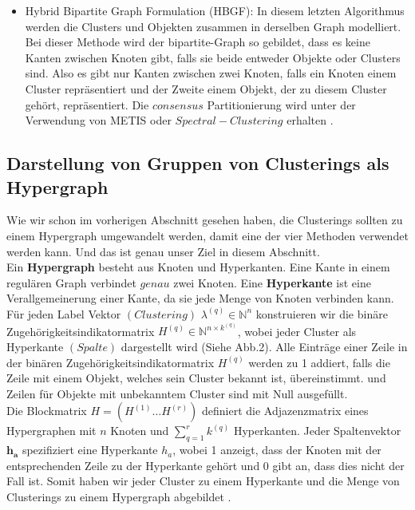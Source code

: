 \documentclass[runningheads]{llncs}
\begin{document}
\begin{itemize}
	\item Hybrid Bipartite Graph Formulation (HBGF): In diesem letzten Algorithmus werden die Clusters und Objekten zusammen in derselben Graph modelliert. Bei dieser Methode wird der bipartite-Graph so gebildet, dass es keine Kanten zwischen Knoten gibt, falls sie beide entweder Objekte oder Clusters sind. Also es gibt nur Kanten zwischen zwei Knoten, falls ein Knoten einem Cluster repräsentiert und der Zweite einem Objekt, der zu diesem Cluster gehört, repräsentiert. Die $consensus$ Partitionierung wird unter der Verwendung von METIS oder $Spectral-Clustering$ erhalten \cite{vega2011survey}.  
\end{itemize}  


\subsection{Darstellung von Gruppen von Clusterings als Hypergraph}
Wie wir schon im vorherigen Abschnitt gesehen haben, die Clusterings sollten zu einem Hypergraph umgewandelt werden, damit eine der vier Methoden verwendet werden kann. Und das ist genau unser Ziel in diesem Abschnitt.\\
Ein \textbf{Hypergraph} besteht aus Knoten und Hyperkanten. Eine Kante in einem regulären Graph verbindet $genau$ zwei Knoten. Eine \textbf{Hyperkante} ist eine Verallgemeinerung einer Kante, da sie jede Menge von Knoten verbinden kann.\\[4pt]
Für jeden Label Vektor $(Clustering)$ $\lambda^{(q)} \in \mathbb{N}^{n}$ konstruieren wir die binäre Zugehörigkeitsindikatormatrix  $H^{(q)} \in \mathbb{N}^{n \times k^{(q)}}$, wobei jeder Cluster als Hyperkante $(Spalte)$ dargestellt wird (Siehe Abb.2). Alle Einträge einer Zeile in der binären Zugehörigkeitsindikatormatrix $H^{(q)}$ werden zu 1 addiert, falls die Zeile mit einem Objekt, welches sein Cluster bekannt ist, übereinstimmt. und Zeilen für Objekte mit unbekanntem Cluster sind mit Null ausgefüllt.\\
Die Blockmatrix $H = (H^{(1)} \ldots H^{(r)})$ definiert die Adjazenzmatrix eines Hypergraphen mit $n$ Knoten und $\sum_{q=1}^{r} k^{(q)}$ Hyperkanten. Jeder Spaltenvektor $\boldsymbol{h_{a}}$ spezifiziert eine Hyperkante $h_{a}$, wobei 1 anzeigt, dass der Knoten mit der entsprechenden Zeile zu der Hyperkante gehört und 0 gibt an, dass dies nicht der Fall ist. Somit haben wir jeder Cluster zu einem Hyperkante und die Menge von Clusterings zu einem Hypergraph abgebildet \cite{strehl2002cluster}.\\ 
\end{document}
